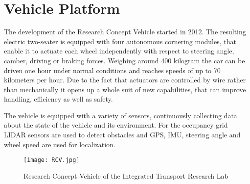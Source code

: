 \chapter{Vehicle Platform}
The development of the Research Concept Vehicle started in 2012. The resulting electric two-seater is equipped with four autonomous cornering modules, that enable it to actuate each wheel independently with respect to steering angle, camber, driving or braking forces. Weighing around 400 kilogram the car can be driven one hour under normal conditions and reaches speeds of up to 70 kilometers per hour. Due to the fact that actuators are controlled by wire rather than mechanically it opens up a whole suit of new capabilities, that can improve handling, efficiency as well as safety.

The vehicle is equipped with a variety of sensors, continuously collecting data about the state of the vehicle and its environment. For the occupancy grid LIDAR sensors are used to detect obstacles and GPS, IMU, steering angle and wheel speed are used for localization.


\begin{figure}[h]
\texttt{[image: RCV.jpg]}
\caption[Research Concept Vehicle of the ITRL]{Research Concept Vehicle of the Integrated Transport Research Lab}
\label{fig:RCV}
\end{figure}